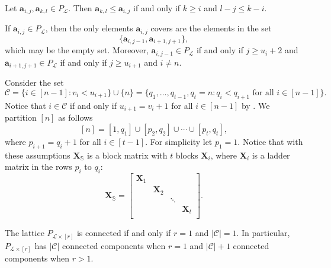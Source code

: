 \documentclass[10pt,a4paper]{amsart}
\newcommand\bda{{\bm a}}
\newcommand\bfS{\mathbb{S}}
\newcommand\bfX{\mathbf{X}}
\newcommand\calC{\mathcal{C}}
\newcommand\calL{\mathcal{L}}
\newcommand{\Lr}{\ensuremath{\calL\times[r]}}
\begin{document}
\begin{Lemma} \label{cor: north east}
       Let $\bda_{i,j}, \bda_{k,l}\in P_{\calL}$. Then $\bda_{k,l}\le \bda_{i,j}$ if and only if $k\ge i$ and $l-j\le k-i$.
\end{Lemma} 

\begin{Lemma} \label{lem: coverinP}
If $\bda_{i,j}\in P_{\calL}$, then the only elements $\bda_{i,j}$ covers are the elements in the set $$ \{\bda_{i,j-1}, \bda_{i+1,j+1}\},$$ which may be the empty set.
Moreover, 
$\bda_{i,j-1} \in P_{\calL} $ if and only if $ j \ge u_i+2$ and $\bda_{i+1, j+1} \in P_{\calL} $ if and only if $j \ge u_{i+1}$ and $i\neq n$.  
\end{Lemma}

\begin{Notation}\label{not: disconnected partition}
    Consider the set $$\calC=\{i\in [n-1]: v_i<u_{i+1}\} \cup \{n\}=\{q_1, \ldots, q_{t-1}, q_t=n: q_{i}<q_{i+1} \text{ for all } i\in[n-1]\}.$$ 
Notice that $i\in \calC$ if and only if $u_{i+1}=v_i+1$ for all $i\in [n-1]$ by .
    We partition $[n]$ as follows \[[n]=[1, q_{1}]\cup [p_{2}, q_2]\cup \cdots \cup[p_{t}, q_t],\] where $p_{i+1}=q_{i}+1$ for all $i\in[t-1]$. 
    For simplicity let $p_1=1$.
Notice that with these assumptions $\bfX_{\bfS}$ is a block matrix with $t$ blocks $\bfX_i$, where $\bfX_i$ is a ladder matrix in the rows $p_i$ to $q_i$:
    $$\bfX_{\bfS}=\begin{bmatrix}
        \bfX_1 &&&\\
        &\bfX_2&&\\
        &&\ddots&\\
        &&&\bfX_t\\
    \end{bmatrix}.$$
\end{Notation}

\begin{Proposition} \label{components}
 The lattice $P_{\Lr}$ is connected if and only if $r=1$ and $|\calC|=1$.
   In particular, $P_{\Lr}$ has $|\calC|$ connected components when $r=1$ and $|\calC| +1$ connected components when $r> 1$. 
\end{Proposition}
\end{document}
